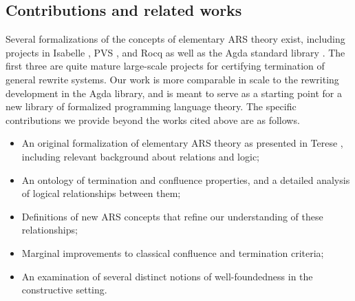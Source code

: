 \subsection{Contributions and related works}
Several formalizations of the concepts of elementary ARS theory exist, including projects in Isabelle \cite{isabelleFormalization}, PVS \cite{trs}, and Rocq \cite{coqARS} as well as the Agda standard library \cite{AgdaLibraryRewriting}.
The first three are quite mature large-scale projects for certifying termination of
general rewrite systems.  Our work is more comparable in scale to the rewriting development in the
Agda library, and is meant to serve as a starting point for a new library of formalized
programming language theory.  The specific contributions we provide beyond the works cited above
are as follows.
\begin{itemize} \label{list:ourContributions}
  \item An original formalization of elementary ARS theory as presented in Terese
  \cite{Terese}, including relevant background about relations and logic;
  \item An ontology of termination and confluence properties, and a detailed analysis of logical relationships between them;
  \item Definitions of new ARS concepts that refine our understanding of these relationships;
  \item Marginal improvements to classical confluence and termination criteria;
  \item An examination of several distinct notions of well-foundedness
  in the constructive setting.
\end{itemize}

